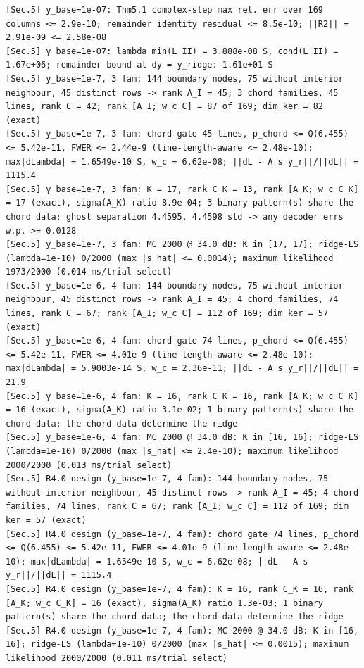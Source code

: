 \documentclass[11pt,a4paper]{article}
\theoremstyle{definition}
\theoremstyle{remark}
\begin{document}
\begin{lstlisting}[style=consolestyle]
[Sec.5] y_base=1e-07: Thm5.1 complex-step max rel. err over 169 columns <= 2.9e-10; remainder identity residual <= 8.5e-10; ||R2|| = 2.91e-09 <= 2.58e-08
[Sec.5] y_base=1e-07: lambda_min(L_II) = 3.888e-08 S, cond(L_II) = 1.67e+06; remainder bound at dy = y_ridge: 1.61e+01 S
[Sec.5] y_base=1e-7, 3 fam: 144 boundary nodes, 75 without interior neighbour, 45 distinct rows -> rank A_I = 45; 3 chord families, 45 lines, rank C = 42; rank [A_I; w_c C] = 87 of 169; dim ker = 82 (exact)
[Sec.5] y_base=1e-7, 3 fam: chord gate 45 lines, p_chord <= Q(6.455) <= 5.42e-11, FWER <= 2.44e-9 (line-length-aware <= 2.48e-10); max|dLambda| = 1.6549e-10 S, w_c = 6.62e-08; ||dL - A s y_r||/||dL|| = 1115.4
[Sec.5] y_base=1e-7, 3 fam: K = 17, rank C_K = 13, rank [A_K; w_c C_K] = 17 (exact), sigma(A_K) ratio 8.9e-04; 3 binary pattern(s) share the chord data; ghost separation 4.4595, 4.4598 std -> any decoder errs w.p. >= 0.0128
[Sec.5] y_base=1e-7, 3 fam: MC 2000 @ 34.0 dB: K in [17, 17]; ridge-LS (lambda=1e-10) 0/2000 (max |s_hat| <= 0.0014); maximum likelihood 1973/2000 (0.014 ms/trial select)
[Sec.5] y_base=1e-6, 4 fam: 144 boundary nodes, 75 without interior neighbour, 45 distinct rows -> rank A_I = 45; 4 chord families, 74 lines, rank C = 67; rank [A_I; w_c C] = 112 of 169; dim ker = 57 (exact)
[Sec.5] y_base=1e-6, 4 fam: chord gate 74 lines, p_chord <= Q(6.455) <= 5.42e-11, FWER <= 4.01e-9 (line-length-aware <= 2.48e-10); max|dLambda| = 5.9003e-14 S, w_c = 2.36e-11; ||dL - A s y_r||/||dL|| = 21.9
[Sec.5] y_base=1e-6, 4 fam: K = 16, rank C_K = 16, rank [A_K; w_c C_K] = 16 (exact), sigma(A_K) ratio 3.1e-02; 1 binary pattern(s) share the chord data; the chord data determine the ridge
[Sec.5] y_base=1e-6, 4 fam: MC 2000 @ 34.0 dB: K in [16, 16]; ridge-LS (lambda=1e-10) 0/2000 (max |s_hat| <= 2.4e-10); maximum likelihood 2000/2000 (0.013 ms/trial select)
[Sec.5] R4.0 design (y_base=1e-7, 4 fam): 144 boundary nodes, 75 without interior neighbour, 45 distinct rows -> rank A_I = 45; 4 chord families, 74 lines, rank C = 67; rank [A_I; w_c C] = 112 of 169; dim ker = 57 (exact)
[Sec.5] R4.0 design (y_base=1e-7, 4 fam): chord gate 74 lines, p_chord <= Q(6.455) <= 5.42e-11, FWER <= 4.01e-9 (line-length-aware <= 2.48e-10); max|dLambda| = 1.6549e-10 S, w_c = 6.62e-08; ||dL - A s y_r||/||dL|| = 1115.4
[Sec.5] R4.0 design (y_base=1e-7, 4 fam): K = 16, rank C_K = 16, rank [A_K; w_c C_K] = 16 (exact), sigma(A_K) ratio 1.3e-03; 1 binary pattern(s) share the chord data; the chord data determine the ridge
[Sec.5] R4.0 design (y_base=1e-7, 4 fam): MC 2000 @ 34.0 dB: K in [16, 16]; ridge-LS (lambda=1e-10) 0/2000 (max |s_hat| <= 0.0015); maximum likelihood 2000/2000 (0.011 ms/trial select)

\end{lstlisting}
\end{document}

